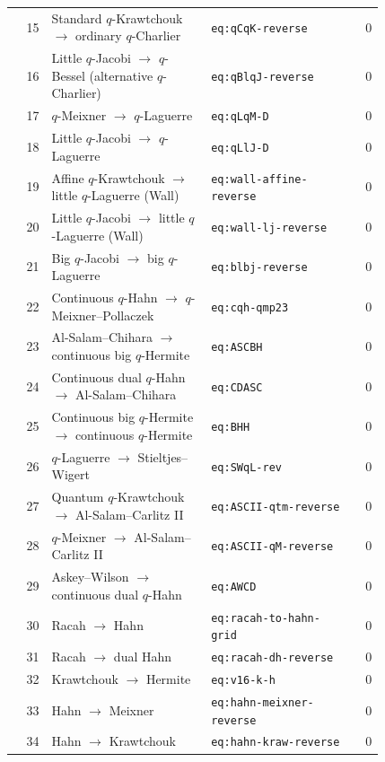 \documentclass[11pt]{article}
\begin{document}
\begin{longtable}{@{}r p{0.43\linewidth} p{0.39\linewidth} r@{}}
15 & Standard $q$-Krawtchouk $\ensuremath{\to}$ ordinary $q$-Charlier & \texttt{eq:qCqK-reverse} & 0 \\
16 & Little $q$-Jacobi $\ensuremath{\to}$ $q$-Bessel (alternative $q$-Charlier) & \texttt{eq:qBlqJ-reverse} & 0 \\
17 & $q$-Meixner $\ensuremath{\to}$ $q$-Laguerre & \texttt{eq:qLqM-D} & 0 \\
18 & Little $q$-Jacobi $\ensuremath{\to}$ $q$-Laguerre & \texttt{eq:qLlJ-D} & 0 \\
19 & Affine $q$-Krawtchouk $\ensuremath{\to}$ little $q$-Laguerre (Wall) & \texttt{eq:wall-affine-reverse} & 0 \\
20 & Little $q$-Jacobi $\ensuremath{\to}$ little $q$-Laguerre (Wall) & \texttt{eq:wall-lj-reverse} & 0 \\
21 & Big $q$-Jacobi $\ensuremath{\to}$ big $q$-Laguerre & \texttt{eq:blbj-reverse} & 0 \\
22 & Continuous $q$-Hahn $\ensuremath{\to}$ $q$-Meixner--Pollaczek & \texttt{eq:cqh-qmp23} & 0 \\
23 & Al-Salam--Chihara $\ensuremath{\to}$ continuous big $q$-Hermite & \texttt{eq:ASCBH} & 0 \\
24 & Continuous dual $q$-Hahn $\ensuremath{\to}$ Al-Salam--Chihara & \texttt{eq:CDASC} & 0 \\
25 & Continuous big $q$-Hermite $\ensuremath{\to}$ continuous $q$-Hermite & \texttt{eq:BHH} & 0 \\
26 & $q$-Laguerre $\ensuremath{\to}$ Stieltjes--Wigert & \texttt{eq:SWqL-rev} & 0 \\
27 & Quantum $q$-Krawtchouk $\ensuremath{\to}$ Al-Salam--Carlitz II & \texttt{eq:ASCII-qtm-reverse} & 0 \\
28 & $q$-Meixner $\ensuremath{\to}$ Al-Salam--Carlitz II & \texttt{eq:ASCII-qM-reverse} & 0 \\
29 & Askey--Wilson $\ensuremath{\to}$ continuous dual $q$-Hahn & \texttt{eq:AWCD} & 0 \\
30 & Racah $\ensuremath{\to}$ Hahn & \texttt{eq:racah-to-hahn-grid} & 0 \\
31 & Racah $\ensuremath{\to}$ dual Hahn & \texttt{eq:racah-dh-reverse} & 0 \\
32 & Krawtchouk $\ensuremath{\to}$ Hermite & \texttt{eq:v16-k-h} & 0 \\
33 & Hahn $\ensuremath{\to}$ Meixner & \texttt{eq:hahn-meixner-reverse} & 0 \\
34 & Hahn $\ensuremath{\to}$ Krawtchouk & \texttt{eq:hahn-kraw-reverse} & 0 \\

\end{longtable}
\end{document}
